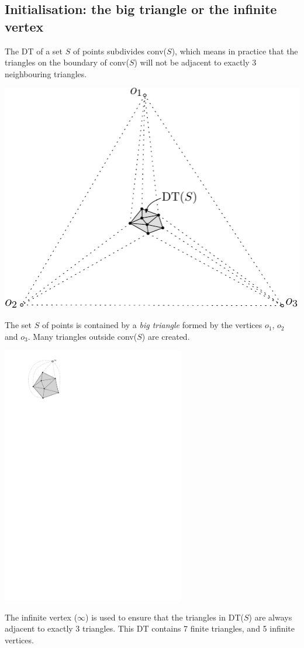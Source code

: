 \subsection{Initialisation: the big triangle or the infinite vertex}%
\label{sec:big_tr}

The DT of a set $S$ of points subdivides conv($S$), which means in practice that the triangles on the boundary of conv($S$) will not be adjacent to exactly 3 neighbouring triangles.

\begin{marginfigure}
  \centering
  \includegraphics[width=\textwidth]{figs/big_tr}
  \caption[The big triangle containing all the dataset.]{The set $S$ of points is contained by a \emph{big triangle} formed by the vertices $o_1$, $o_2$ and $o_3$. Many triangles outside conv($S$) are created.}%
\label{fig:big_tr}
\end{marginfigure}
\begin{marginfigure}
  \centering
  \includegraphics[width=0.6\textwidth]{figs/infinite_vertex}
  \caption[The infinite vertex.]{The infinite vertex ($\infty$) is used to ensure that the triangles in DT($S$) are always adjacent to exactly 3 triangles. This DT contains 7 finite triangles, and 5 infinite vertices.}%
\label{fig:infinite_vertex}
\end{marginfigure}
